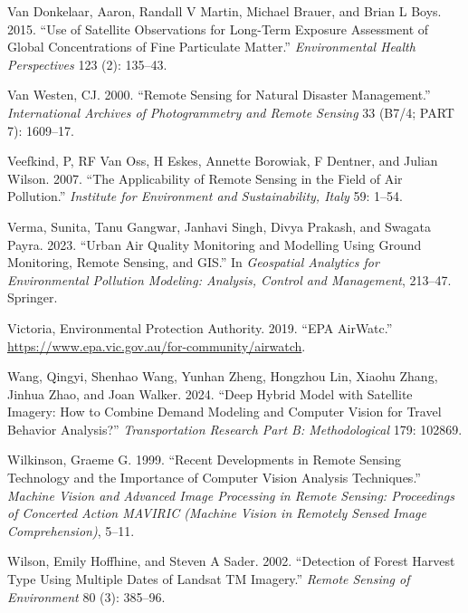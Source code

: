 \documentclass[
  letterpaper,
  DIV=11,
  numbers=noendperiod]{scrreprt}
\newlength{\cslhangindent}
\newlength{\cslentryspacingunit} %
\newenvironment{CSLReferences}[2] %
 {%
  \setlength{\parindent}{0pt}
  \ifodd #1
  \let\oldpar\par
  \def\par{\hangindent=\cslhangindent\oldpar}
  \fi
  \setlength{\parskip}{#2\cslentryspacingunit}
 }%
 {}
\begin{document}
\begin{CSLReferences}{1}{0}
\leavevmode{}%
Van Donkelaar, Aaron, Randall V Martin, Michael Brauer, and Brian L
Boys. 2015. {``Use of Satellite Observations for Long-Term Exposure
Assessment of Global Concentrations of Fine Particulate Matter.''}
\emph{Environmental Health Perspectives} 123 (2): 135--43.

\leavevmode{}%
Van Westen, CJ. 2000. {``Remote Sensing for Natural Disaster
Management.''} \emph{International Archives of Photogrammetry and Remote
Sensing} 33 (B7/4; PART 7): 1609--17.

\leavevmode{}%
Veefkind, P, RF Van Oss, H Eskes, Annette Borowiak, F Dentner, and
Julian Wilson. 2007. {``The Applicability of Remote Sensing in the Field
of Air Pollution.''} \emph{Institute for Environment and Sustainability,
Italy} 59: 1--54.

\leavevmode{}%
Verma, Sunita, Tanu Gangwar, Janhavi Singh, Divya Prakash, and Swagata
Payra. 2023. {``Urban Air Quality Monitoring and Modelling Using Ground
Monitoring, Remote Sensing, and GIS.''} In \emph{Geospatial Analytics
for Environmental Pollution Modeling: Analysis, Control and Management},
213--47. Springer.

\leavevmode{}%
Victoria, Environmental Protection Authority. 2019. {``EPA AirWatc.''}
\url{https://www.epa.vic.gov.au/for-community/airwatch}.

\leavevmode{}%
Wang, Qingyi, Shenhao Wang, Yunhan Zheng, Hongzhou Lin, Xiaohu Zhang,
Jinhua Zhao, and Joan Walker. 2024. {``Deep Hybrid Model with Satellite
Imagery: How to Combine Demand Modeling and Computer Vision for Travel
Behavior Analysis?''} \emph{Transportation Research Part B:
Methodological} 179: 102869.

\leavevmode{}%
Wilkinson, Graeme G. 1999. {``Recent Developments in Remote Sensing
Technology and the Importance of Computer Vision Analysis Techniques.''}
\emph{Machine Vision and Advanced Image Processing in Remote Sensing:
Proceedings of Concerted Action MAVIRIC (Machine Vision in Remotely
Sensed Image Comprehension)}, 5--11.

\leavevmode{}%
Wilson, Emily Hoffhine, and Steven A Sader. 2002. {``Detection of Forest
Harvest Type Using Multiple Dates of Landsat TM Imagery.''} \emph{Remote
Sensing of Environment} 80 (3): 385--96.


\end{CSLReferences}
\end{document}
